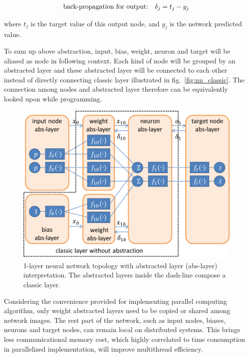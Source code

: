 \documentclass[procedia]{easychair}
\begin{document}
\begin{align}
    & \text{back-propagation for output:} & \delta_j = t_j - y_j \notag
\end{align}

where $t_j$ is the target value of this output node, and $y_j$ is the network predicted value.

To sum up above abstraction, input, bias, weight, neuron and target will be aliased as node in following context.  Each kind of node will be grouped by an abstracted layer and these abstracted layer will be connected to each other instead of directly connecting classic layer illustrated in fig.~\ref{fig:nn_classic}.  The connection among nodes and abstracted layer therefore can be equivalently looked upon while programming.

\begin{figure}[tb]
    \begin{centering}
        \includegraphics[scale=0.5]{../../pic/nn_abstracted.png}
        \caption{1-layer neural network topology with abstracted layer (abs-layer) interpretation.  The abstracted layers inside the dash-line compose a classic layer.}
        \label{fig:nn_abstracted}
	\end{centering}
\end{figure}

Considering the convenience provided for implementing parallel computing algorithm, only weight abstracted layers need to be copied or shared among network images.  The rest part of the network, such as input nodes, biases, neurons and target nodes, can remain local on distributed systems.  This brings less communicational memory cost, which highly correlated to time consumption in parallelized implementation, will improve multithread efficiency.
\end{document}
